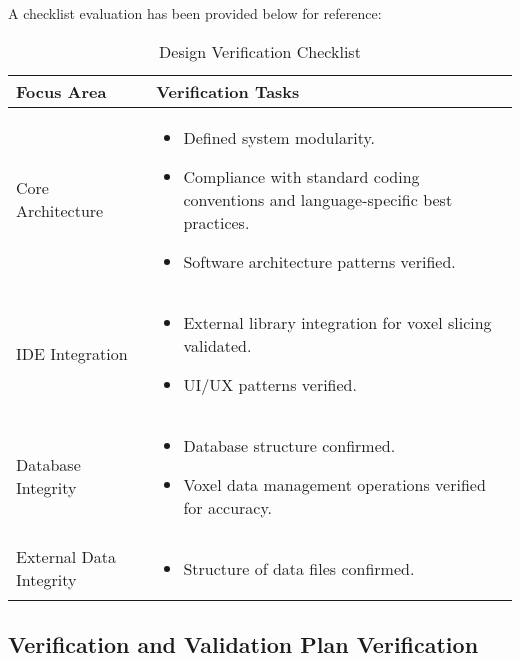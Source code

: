 \documentclass[12pt, titlepage]{article}
\begin{document}
\noindent A checklist evaluation has been provided below for reference:\\

\begin{table}[H]
\centering
\caption{Design Verification Checklist}
\renewcommand{\arraystretch}{1.3}
\setlength{\tabcolsep}{8pt}
\begin{tabular}{|p{}|p{}|}
\hline
\textbf{Focus Area} & \textbf{Verification Tasks} \\ \hline
Core Architecture &
\begin{itemize}
\item Defined system modularity.
\item Compliance with standard coding conventions and language-specific best practices.
\item Software architecture patterns verified.
\end{itemize} \\ \hline
IDE Integration &
\begin{itemize}
\item External library integration for voxel slicing validated.
\item UI/UX patterns verified.
\end{itemize} \\ \hline
Database Integrity &
\begin{itemize}
\item Database structure confirmed.
\item Voxel data management operations verified for accuracy.
\end{itemize} \\ \hline
External Data Integrity &
\begin{itemize}
\item Structure of data files confirmed.
\end{itemize} \\ \hline
\end{tabular}
\end{table}


\subsection{Verification and Validation Plan Verification}
\end{document}
